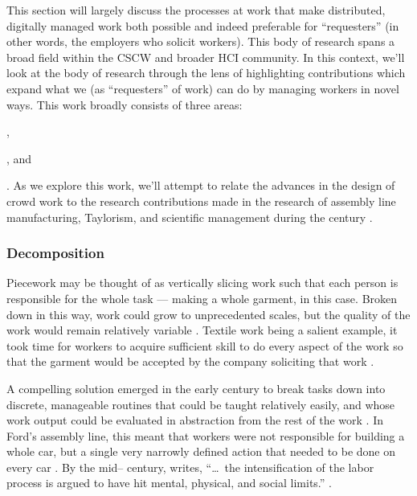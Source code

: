 \documentclass[trackingWork]{subfiles}
\begin{document}
{This section will largely discuss the processes at work that make distributed,
digitally managed work both possible and indeed preferable for ``requesters''
(in other words, the employers who solicit workers).
This body of research spans a broad field
within the CSCW and broader HCI community.
In this context,
we'll look at the body of research through the lens of
highlighting contributions which expand what we
(as ``requesters'' of work) can do by managing workers in novel ways.
This work broadly consists of three areas:
\begin{inlinelist}
\item {},
\item {}, and
\item {}
\end{inlinelist}.
As we explore this work, we'll
attempt to relate the advances in the design of crowd work to
the research contributions made in the research of assembly line manufacturing,
Taylorism, and
scientific management 
during the  century
\cite{hu1961parallel}.


\subsubsection{Decomposition}\label{sec:decomposition}
Piecework may be thought of as vertically slicing work such that 
each person is responsible for the whole task
--- making a whole garment, in this case.
Broken down in this way, work could grow to unprecedented scales,
but the quality of the work would remain relatively variable
\cite{murray1983decentralisation}.
Textile work being a salient example,
it took time for workers to acquire sufficient skill
to do every aspect of the work so that the garment would be accepted by the company soliciting that work
\cite{vezina1992light}.

A compelling solution emerged in the early  century to break tasks down into discrete,
manageable routines that could be taught relatively easily,
and whose work output could be evaluated in abstraction from the rest of the work
\cite{restructuringPieceworkBaker}.
In Ford's assembly line, this meant that workers were not responsible for building a whole car,
but a single very narrowly defined action that needed to be done on every car
\cite{towardsGlobalFordism}.
By the mid-- century, \citeauthor{schoenberger1988fordism} writes,
``\dots~the intensification of the labor process is argued to have hit mental, physical, and social limits.''
\cite{schoenberger1988fordism}.


}
\end{document}
